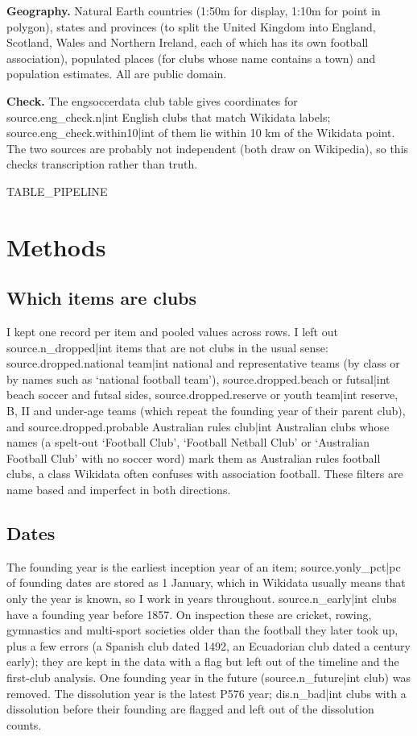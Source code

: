 \documentclass[11pt,a4paper]{article}
\begin{document}
\textbf{Geography.} Natural Earth \citep{naturalearth} countries (1:50m for display, 1:10m for point in polygon), states and provinces (to split the United Kingdom into England, Scotland, Wales and Northern Ireland, each of which has its own football association), populated places (for clubs whose name contains a town) and population estimates. All are public domain.

\textbf{Check.} The engsoccerdata club table \citep{engsoccer} gives coordinates for {{source.eng_check.n|int}} English clubs that match Wikidata labels; {{source.eng_check.within10|int}} of them lie within 10 km of the Wikidata point. The two sources are probably not independent (both draw on Wikipedia), so this checks transcription rather than truth.

{{TABLE_PIPELINE}}

\section{Methods}
\subsection{Which items are clubs}
I kept one record per item and pooled values across rows. I left out {{source.n_dropped|int}} items that are not clubs in the usual sense: {{source.dropped.national team|int}} national and representative teams (by class or by names such as `national football team'), {{source.dropped.beach or futsal|int}} beach soccer and futsal sides, {{source.dropped.reserve or youth team|int}} reserve, B, II and under-age teams (which repeat the founding year of their parent club), and {{source.dropped.probable Australian rules club|int}} Australian clubs whose names (a spelt-out `Football Club', `Football Netball Club' or `Australian Football Club' with no soccer word) mark them as Australian rules football clubs, a class Wikidata often confuses with association football. These filters are name based and imperfect in both directions.

\subsection{Dates}
The founding year is the earliest inception year of an item; {{source.yonly_pct|pc}} of founding dates are stored as 1 January, which in Wikidata usually means that only the year is known, so I work in years throughout. {{source.n_early|int}} clubs have a founding year before 1857. On inspection these are cricket, rowing, gymnastics and multi-sport societies older than the football they later took up, plus a few errors (a Spanish club dated 1492, an Ecuadorian club dated a century early); they are kept in the data with a flag but left out of the timeline and the first-club analysis. One founding year in the future ({{source.n_future|int}} club) was removed. The dissolution year is the latest P576 year; {{dis.n_bad|int}} clubs with a dissolution before their founding are flagged and left out of the dissolution counts.
\end{document}

